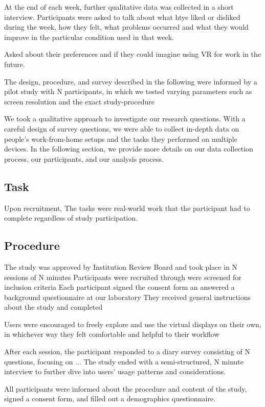 At the end of each week, further qualitative data was collected in a short interview. 
Participants were asked to talk about what htye liked or disliked during the week, 
how they felt, 
what problems occurred and what they would improve in the particular condition used in that week. 

Asked about their preferences and if they could imagine using VR for work in the future. 

The design, procedure, and survey described in the following were informed by a pilot study with N participants, in which we tested varying parameters such as screen resolution and the exact study-procedure 

We took a qualitative approach to investigate our research questions. 
With a careful design of survey questions, we were able to collect in-depth data on people's work-from-home setups and the tasks they performed on multiple devices. 
In the following section, we provide more details on our data collection process, 
our participants, 
and our analysis process. 

 \subsection{Task}
 Upon recruitment, 
 The tasks were real-world work that the participant had to complete regardless of study participation. 

 \subsection{Procedure}
 The study was approved by Institution Review Board
 and took place in N sessions of N minutes
 Participants were recruited through 
 were screened for inclusion criteria
 Each participant signed the consent form an answered a background questionnaire at our laboratory
 They received general instructions about the study and completed 

Users were encouraged to freely explore and use the virtual displays on their own, in whichever way they felt comfortable and helpful to their workflow 

After each session, the participant responded to a diary survey consisting of N questions, focusing on ...
The study ended with a semi-structured, N minute interview to further dive into users' usage patterns and considerations. 

All participants were informed about the procedure and content of the study, signed a consent form, and filled out a demographics questionnaire. 

